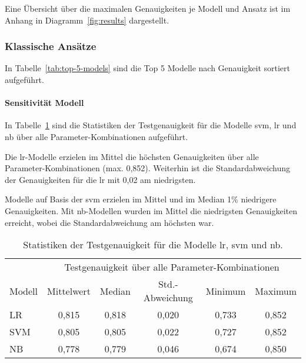 Eine Übersicht über die maximalen Genauigkeiten je Modell und Ansatz ist im Anhang in Diagramm~\ref{fig:results} dargestellt.

\subsubsection{Klassische Ansätze}\label{subsubsec:ergebnisse-klassische-ansaetze}

In Tabelle~\ref{tab:top-5-models} sind die Top 5 Modelle nach Genauigkeit sortiert aufgeführt.

\paragraph{Sensitivität Modell}
In Tabelle~\ref{tab:stats-per-model} sind die Statistiken der Testgenauigkeit für die Modelle \gls{svm}, \gls{lr} und \gls{nb} über alle Parameter-Kombinationen aufgeführt.

Die \gls{lr}-Modelle erzielen im Mittel die höchsten Genauigkeiten über alle Parameter-Kombinationen (max. 0,852).
Weiterhin ist die Standardabweichung der Genauigkeiten für die \gls{lr} mit 0,02 am niedrigsten.

Modelle auf Basis der \gls{svm} erzielen im Mittel und im Median 1\% niedrigere Genauigkeiten.
Mit \gls{nb}-Modellen wurden im Mittel die niedrigsten Genauigkeiten erreicht, wobei die Standardabweichung am höchsten war.

\begin{table}
    \center
    \begin{tabular}{lccccc}
        \toprule
        & \multicolumn{5}{c}{Testgenauigkeit über alle Parameter-Kombinationen} \\
        Modell             & Mittelwert & Median & Std.-Abweichung & Minimum & Maximum \\
        \midrule
        LR                 & 0,815      & 0,818  & 0,020           & 0,733   & 0,852 \\
        SVM                & 0,805      & 0,805  & 0,022           & 0,727   & 0,852 \\
        NB                 & 0,778      & 0,779  & 0,046           & 0,674   & 0,850 \\
        \bottomrule
    \end{tabular}
    \caption{Statistiken der Testgenauigkeit für die Modelle \gls{lr}, \gls{svm} und \gls{nb}.}
    \label{tab:stats-per-model}
\end{table}

